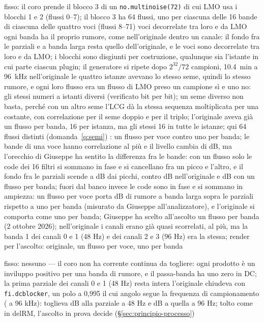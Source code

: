 {fisso: il coro prende il blocco 3 di un \texttt{no.multinoise(72)} di cui LMO usa i blocchi 1 e 2 (flussi 0--7); il blocco 3 ha 64 flussi, uno per ciascuna delle 16 bande di ciascuna delle quattro voci (flussi 8--71)}
{voci decorrelate tra loro e da LMO}
{ogni banda ha il proprio rumore, come nell'originale dentro un canale: il fondo fra le parziali e a banda larga resta quello dell'originale, e le voci sono decorrelate tra loro e da LMO; i blocchi sono disgiunti per costruzione, qualunque sia l'istante in cui parte ciascun plugin; il generatore si ripete dopo $2^{32}/72$ campioni, \qty{10.4}{\minute} a \qty{96}{\kilo\hertz}}
{nell'originale le quattro istanze avevano lo stesso seme, quindi lo stesso rumore, e ogni loro flusso era un flusso di LMO preso un campione sì e uno no: gli stessi numeri a istanti diversi (verificato bit per bit); un seme diverso non basta, perché con un altro seme l'LCG dà la stessa sequenza moltiplicata per una costante, con correlazione  per il seme doppio e  per il triplo; l'originale aveva già un flusso per banda, 16 per istanza, ma gli stessi 16 in tutte le istanze; qui 64 flussi distinti (domanda~\ref{q:semi})}
{\deciso}
{: un flusso per voce contro uno per banda; le bande di una voce hanno correlazione al più  e il livello cambia di  dB, ma l'orecchio di Giuseppe ha sentito la differenza fra le bande: con un flusso solo le code dei 16 filtri si sommano in fase e si cancellano fra un picco e l'altro, e il fondo fra le parziali scende a  dB dai picchi, contro  dB nell'originale e  dB con un flusso per banda; fuori dal banco invece le code sono in fase e si sommano in ampiezza: un flusso per voce porta  dB di rumore a banda larga sopra le parziali rispetto a uno per banda (misurato da Giuseppe all'analizzatore), e l'originale si comporta come uno per banda; Giuseppe ha scelto all'ascolto un flusso per banda (2 ottobre 2026); nell'originale i canali erano già quasi scorrelati,  al più, ma la banda 1 dei canali 0 e 1 (48 Hz) e dei canali 2 e 3 (96 Hz) era la stessa; render per l'ascolto: originale, un flusso per voce, uno per banda}


{fisso: nessuno}
{---}
{il coro non ha corrente continua da togliere: ogni prodotto è un inviluppo positivo per una banda di rumore, e il passa-banda ha uno zero in DC; la prima parziale dei canali 0 e 1 (48 Hz) resta intera}
{l'originale chiudeva con \texttt{fi.dcblocker}, un polo a 0,995 il cui angolo segue la frequenza di campionamento ( a 96 kHz): toglieva  dB alla parziale a 48 Hz e  dB a quella a 96 Hz; tolto come in delRM, l'ascolto in prova decide (\S\ref{sec:principio-processo})}
{\daprovare}
{}


